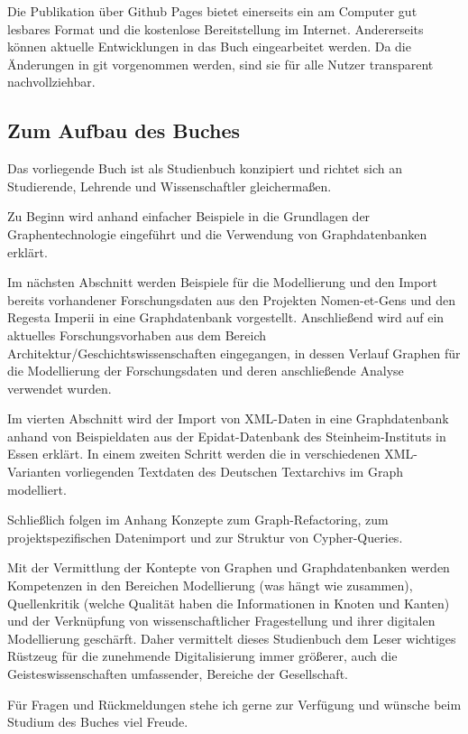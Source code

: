 \documentclass[12pt,ngerman,]{article}
\begin{document}
Die Publikation über Github Pages bietet einerseits ein am Computer gut
lesbares Format und die kostenlose Bereitstellung im Internet.
Andererseits können aktuelle Entwicklungen in das Buch eingearbeitet
werden. Da die Änderungen in git vorgenommen werden, sind sie für alle
Nutzer transparent nachvollziehbar.

\subsection{Zum Aufbau des Buches}\label{zum-aufbau-des-buches}

Das vorliegende Buch ist als Studienbuch konzipiert und richtet sich an
Studierende, Lehrende und Wissenschaftler gleichermaßen.

Zu Beginn wird anhand einfacher Beispiele in die Grundlagen der
Graphentechnologie eingeführt und die Verwendung von Graphdatenbanken
erklärt.

Im nächsten Abschnitt werden Beispiele für die Modellierung und den
Import bereits vorhandener Forschungsdaten aus den Projekten
Nomen-et-Gens und den Regesta Imperii in eine Graphdatenbank
vorgestellt. Anschließend wird auf ein aktuelles Forschungsvorhaben aus
dem Bereich Architektur/Geschichtswissenschaften eingegangen, in dessen
Verlauf Graphen für die Modellierung der Forschungsdaten und deren
anschließende Analyse verwendet wurden.

Im vierten Abschnitt wird der Import von XML-Daten in eine
Graphdatenbank anhand von Beispieldaten aus der Epidat-Datenbank des
Steinheim-Instituts in Essen erklärt. In einem zweiten Schritt werden
die in verschiedenen XML-Varianten vorliegenden Textdaten des Deutschen
Textarchivs im Graph modelliert.

Schließlich folgen im Anhang Konzepte zum Graph-Refactoring, zum
projektspezifischen Datenimport und zur Struktur von Cypher-Queries.

Mit der Vermittlung der Kontepte von Graphen und Graphdatenbanken werden
Kompetenzen in den Bereichen Modellierung (was hängt wie zusammen),
Quellenkritik (welche Qualität haben die Informationen in Knoten und
Kanten) und der Verknüpfung von wissenschaftlicher Fragestellung und
ihrer digitalen Modellierung geschärft. Daher vermittelt dieses
Studienbuch dem Leser wichtiges Rüstzeug für die zunehmende
Digitalisierung immer größerer, auch die Geisteswissenschaften
umfassender, Bereiche der Gesellschaft.

Für Fragen und Rückmeldungen stehe ich gerne zur Verfügung und wünsche
beim Studium des Buches viel Freude.
\end{document}
